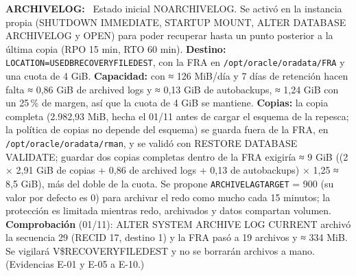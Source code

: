 \documentclass[11pt,a4paper]{article}
\DeclareRobustCommand{\_}{\textunderscore\allowbreak}
\newcommand{\tb}[1]{\texttt{#1}}
\newcommand{\campo}[1]{\textbf{#1:}~}                 %
\begin{document}
\campo{ARCHIVELOG} Estado inicial NOARCHIVELOG. Se activó en la instancia propia (SHUTDOWN IMMEDIATE, STARTUP MOUNT, ALTER DATABASE ARCHIVELOG y OPEN) para poder recuperar hasta un punto posterior a la última copia (RPO 15 min, RTO 60 min). \textbf{Destino:} \tb{LOCATION=USE\_DB\_RECOVERY\_FILE\_DEST}, con la FRA en \tb{/opt/oracle/oradata/FRA} y una cuota de 4 GiB. \textbf{Capacidad:} con ≈ 126 MiB/día y 7 días de retención hacen falta ≈ 0,86 GiB de archived logs y ≈ 0,13 GiB de autobackups, ≈ 1,24 GiB con un 25\,\% de margen, así que la cuota de 4 GiB se mantiene. \textbf{Copias:} la copia completa (2.982,93 MiB, hecha el 01/11 antes de cargar el esquema de la repesca; la política de copias no depende del esquema) se guarda fuera de la FRA, en \tb{/opt/oracle/oradata/rman}, y se validó con RESTORE DATABASE VALIDATE; guardar dos copias completas dentro de la FRA exigiría ≈ 9 GiB ((2 × 2,91 GiB de copias + 0,86 de archived logs + 0,13 de autobackups) × 1,25 ≈ 8,5 GiB), más del doble de la cuota. Se propone \tb{ARCHIVE\_LAG\_TARGET} = 900 (su valor por defecto es 0) para archivar el redo como mucho cada 15 minutos; la protección es limitada mientras redo, archivados y datos compartan volumen. \textbf{Comprobación} (01/11): ALTER SYSTEM ARCHIVE LOG CURRENT archivó la secuencia 29 (RECID 17, destino 1) y la FRA pasó a 19 archivos y ≈ 334 MiB. Se vigilará V\$RECOVERY\_FILE\_DEST y no se borrarán archivos a mano. (Evidencias E-01 y E-05 a E-10.)

\end{document}
